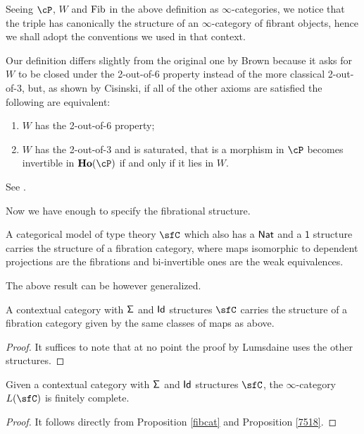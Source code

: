 \begin{rmk}
  Seeing $\cP$, $W$ and $\operatorname{Fib}$ in the above definition as $\infty$-categories, we
  notice that the triple has canonically the structure of an $\infty$-category
  of fibrant objects, hence we shall adopt the conventions we used in that
  context.
\end{rmk}

\begin{rmk}
  Our definition differs slightly from the original one by Brown
  because it asks for $W$ to be closed under the 2-out-of-6 property
  instead of the more classical 2-out-of-3, but, as shown by Cisinski, if all of
  the other axioms are satisfied the following are equivalent:
  \begin{enumerate}
    \item $W$ has the 2-out-of-6 property;
    \item $W$ has the 2-out-of-3 and is saturated, that is a morphism in $\cP$
      becomes invertible in $\ho(\cP)$ if and only if it lies in $W$.
  \end{enumerate}
  See \cite[Thm.~7.2.7]{RB06}.
\end{rmk}

Now we have enough to specify the fibrational structure.

\begin{prop}
  A categorical model of type theory $\sfC$ which also has a $\operatorname{\mathsf{Nat}}$ and a
  $\mathsf{1}$
  structure carries the structure of a fibration category, where maps isomorphic
  to dependent projections are the fibrations and bi-invertible ones are the
  weak equivalences.
\end{prop}

The above result can be however generalized.

\begin{prop}\label{fibcat}
  A contextual category with $\operatorname{\mathsf{\Sigma}}$ and $\operatorname{\mathsf{Id}}$ structures $\sfC$ carries the
  structure of a fibration category given by the same classes of maps as above.
\end{prop}
\begin{proof}
  It suffices to note that at no point the proof by Lumsdaine uses the other
  structures.
\end{proof}

\begin{cor}\label{fincompl1}
  Given a contextual category with $\operatorname{\mathsf{\Sigma}}$ and $\operatorname{\mathsf{Id}}$ structures $\sfC$, the
  $\infty$-category $L(\sfC)$ is finitely complete.
\end{cor}
\begin{proof}
  It follows directly from Proposition \ref{fibcat} and Proposition \ref{7518}.
\end{proof}

